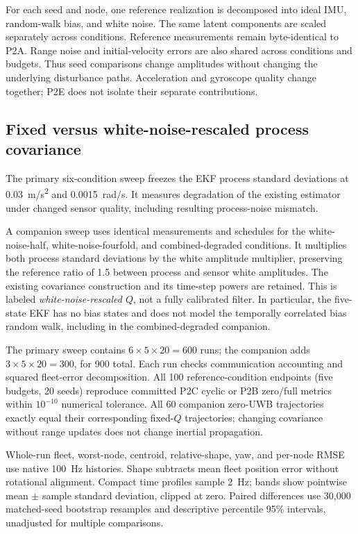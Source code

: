 For each seed and node, one reference realization is decomposed into ideal IMU, random-walk bias, and white noise. The same latent components are scaled separately across conditions. Reference measurements remain byte-identical to P2A. Range noise and initial-velocity errors are also shared across conditions and budgets. Thus seed comparisons change amplitudes without changing the underlying disturbance paths. Acceleration and gyroscope quality change together; P2E does not isolate their separate contributions.

\subsection{Fixed versus white-noise-rescaled process covariance}
The primary six-condition sweep freezes the EKF process standard deviations at \SI{0.03}{m/s^2} and \SI{0.0015}{rad/s}. It measures degradation of the existing estimator under changed sensor quality, including resulting process-noise mismatch.

A companion sweep uses identical measurements and schedules for the white-noise-half, white-noise-fourfold, and combined-degraded conditions. It multiplies both process standard deviations by the white amplitude multiplier, preserving the reference ratio of 1.5 between process and sensor white amplitudes. The existing covariance construction and its time-step powers are retained. This is labeled \emph{white-noise-rescaled \(Q\)}, not a fully calibrated filter. In particular, the five-state EKF has no bias states and does not model the temporally correlated bias random walk, including in the combined-degraded companion.

The primary sweep contains \(6\times5\times20=600\) runs; the companion adds \(3\times5\times20=300\), for 900 total. Each run checks communication accounting and squared fleet-error decomposition. All 100 reference-condition endpoints (five budgets, 20 seeds) reproduce committed P2C cyclic or P2B zero/full metrics within \(10^{-10}\) numerical tolerance. All 60 companion zero-UWB trajectories exactly equal their corresponding fixed-\(Q\) trajectories; changing covariance without range updates does not change inertial propagation.

Whole-run fleet, worst-node, centroid, relative-shape, yaw, and per-node RMSE use native \SI{100}{Hz} histories. Shape subtracts mean fleet position error without rotational alignment. Compact time profiles sample \SI{2}{Hz}; bands show pointwise mean \(\pm\) sample standard deviation, clipped at zero. Paired differences use 30,000 matched-seed bootstrap resamples and descriptive percentile 95\% intervals, unadjusted for multiple comparisons.

